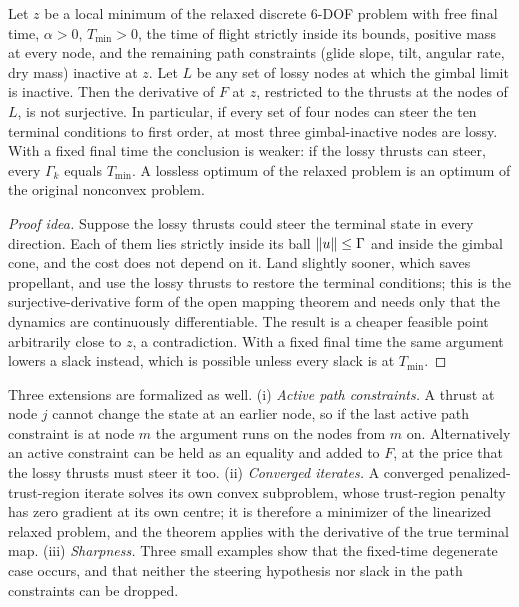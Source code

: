 \begin{theorem}\label{thm:slack}
Let $z$ be a local minimum of the relaxed discrete 6-DOF problem with free final time, $\alpha>0$, $T_{\min}>0$, the time of flight
strictly inside its bounds, positive mass at every node, and the remaining path constraints (glide slope, tilt, angular rate, dry
mass) inactive at $z$. Let $L$ be any set of lossy nodes at which the gimbal limit is inactive. Then the derivative of $F$ at $z$,
restricted to the thrusts at the nodes of $L$, is not surjective. In particular, if every set of four nodes can steer the ten
terminal conditions to first order, at most three gimbal-inactive nodes are lossy. With a fixed final time the conclusion is
weaker: if the lossy thrusts can steer, every $\Gamma_k$ equals $T_{\min}$. A lossless optimum of the relaxed problem is an optimum of
the original nonconvex problem.
\end{theorem}
\begin{proof}[Proof idea]
Suppose the lossy thrusts could steer the terminal state in every direction. Each of them lies strictly inside its ball
$\lVert u\rVert\le\Gamma$ and inside the gimbal cone, and the cost does not depend on it. Land slightly sooner, which saves propellant,
and use the lossy thrusts to restore the terminal conditions; this is the surjective-derivative form of the open mapping theorem and
needs only that the dynamics are continuously differentiable. The result is a cheaper feasible point arbitrarily close to $z$, a
contradiction. With a fixed final time the same argument lowers a slack instead, which is possible unless every slack is at
$T_{\min}$.
\end{proof}
Three extensions are formalized as well. (i) \emph{Active path constraints.} A thrust at node $j$ cannot change the state at an
earlier node, so if the last active path constraint is at node $m$ the argument runs on the nodes from $m$ on. Alternatively an
active constraint can be held as an equality and added to $F$, at the price that the lossy thrusts must steer it too.
(ii) \emph{Converged iterates.} A converged penalized-trust-region iterate solves its own convex subproblem, whose trust-region
penalty has zero gradient at its own centre; it is therefore a minimizer of the linearized relaxed problem, and the theorem applies
with the derivative of the true terminal map. (iii) \emph{Sharpness.} Three small examples show that the fixed-time degenerate
case occurs, and that neither the steering hypothesis nor slack in the path constraints can be dropped.

